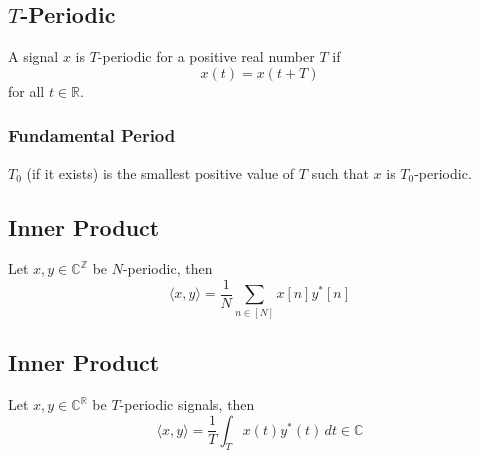 \documentclass{article}
\begin{document}
\begin{paracol}{2}
\switchcolumn[1]
\subsection{\( T \)-Periodic}
\begin{definition}
    A signal \( x \) is \( T \)-periodic for a positive real number \( T \) if
    \begin{equation*}
        x(t) = x(t + T)
    \end{equation*}
    for all \( t \in \mathbb{R} \).
\end{definition}

\subsubsection{Fundamental Period}
\begin{definition}
    \( T_0 \) (if it exists) is the smallest positive value of \( T \) such that \( x \) is \( T_0 \)-periodic.
\end{definition}

\switchcolumn[0]
\subsection{Inner Product}
\begin{definition}
    Let \( x, y \in \mathbb{C}^{\mathbb{Z}} \) be \( N \)-periodic, then
    \begin{equation*}
        \langle x, y \rangle = \frac{1}{N} \sum_{n \in [N]} x[n]y^*[n]
    \end{equation*}
\end{definition}

\switchcolumn[1]
\subsection{Inner Product}
\begin{definition}
    Let \( x, y \in \mathbb{C}^{\mathbb{R}} \) be \( T \)-periodic signals, then
    \begin{equation*}
        \langle x, y \rangle = \frac{1}{T} \int_{T} x(t)y^*(t) \, dt \in \mathbb{C}
    \end{equation*}
\end{definition}

\switchcolumn[0]
\newpage

\end{paracol}
\end{document}
